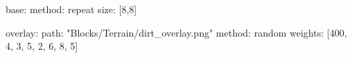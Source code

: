 base:
  method: repeat
  size: [8,8]

overlay:
  path: "Blocks/Terrain/dirt_overlay.png"
  method: random
  weights: [400, 4, 3, 5, 2, 6, 8, 5]